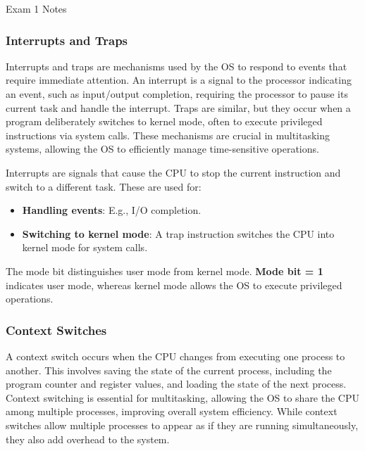 \begin{examnotes}{Exam 1 Notes}
    \subsubsection*{Interrupts and Traps}
    
    Interrupts and traps are mechanisms used by the OS to respond to events that require immediate attention. An interrupt is a signal to the processor indicating an event, such as input/output completion, 
    requiring the processor to pause its current task and handle the interrupt. Traps are similar, but they occur when a program deliberately switches to kernel mode, often to execute privileged instructions 
    via system calls. These mechanisms are crucial in multitasking systems, allowing the OS to efficiently manage time-sensitive operations.
    
    \begin{highlight}
        Interrupts are signals that cause the CPU to stop the current instruction and switch to a different task. These are used for:
        \begin{itemize}
            \item \textbf{Handling events}: E.g., I/O completion.
            \item \textbf{Switching to kernel mode}: A trap instruction switches the CPU into kernel mode for system calls.
        \end{itemize}
    \end{highlight}
    
    The mode bit distinguishes user mode from kernel mode. \textbf{Mode bit = 1} indicates user mode, whereas kernel mode allows the OS to execute privileged operations.
    
    \subsubsection*{Context Switches}
    
    A context switch occurs when the CPU changes from executing one process to another. This involves saving the state of the current process, including the program counter and register values, and 
    loading the state of the next process. Context switching is essential for multitasking, allowing the OS to share the CPU among multiple processes, improving overall system efficiency. While 
    context switches allow multiple processes to appear as if they are running simultaneously, they also add overhead to the system.
    

\end{examnotes}
